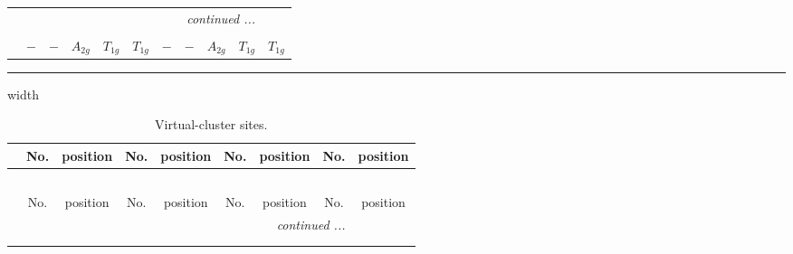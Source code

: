 \documentclass[fleqn,10pt,landscape]{article}
\begin{document}
\begin{itemize}
\begin{center}
\begin{longtable}{ccccccccccc}
 \hline \hline
\multicolumn{10}{r}{\footnotesize\it continued ...} \\ \endfoot

 \hline \hline
\multicolumn{10}{r}{} \\ \endlastfoot

$  $ & $ - $ & $ - $ & $ A_{2g} $ & $ T_{1g} $ & $ T_{1g} $ & $ - $ & $ - $ & $ A_{2g} $ & $ T_{1g} $ & $ T_{1g} $ \\
\end{longtable}
\end{center}

 \hfil \hrule height 1mm width \textwidth \hfil

{
\scriptsize
\begin{center}
\renewcommand{\arraystretch}{1.7}
\begin{longtable}{ccccccccc}
\caption{Virtual-cluster sites.}
 \\
 \hline \hline
 & No. & position & No. & position & No. & position & No. & position \\ \hline \endfirsthead

\multicolumn{8}{l}{\tablename\ \thetable{}} \\
 \hline \hline
 & No. & position & No. & position & No. & position & No. & position \\ \hline \endhead

 \hline \hline
\multicolumn{8}{r}{\footnotesize\it continued ...} \\ \endfoot

 \hline \hline
\multicolumn{8}{r}{} \\ \endlastfoot


\end{longtable}
\end{center}}
\end{itemize}
\end{document}
